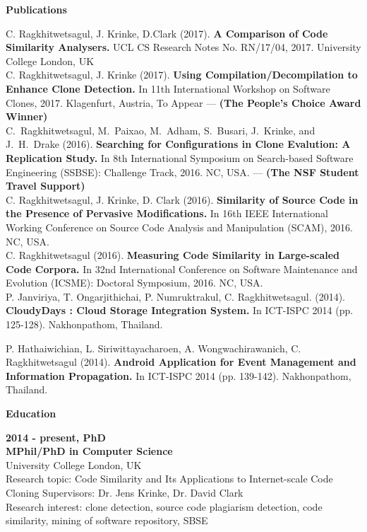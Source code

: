\documentclass[a4paper,12pt,final]{memoir}
\newcommand{\Sep}{\vspace{1.5em}}
\newcommand{\SmallSep}{\vspace{0.5em}}
\newcommand{\CVSection}[1]
	{\Large\textbf{#1}\par
	\SmallSep\normalsize\normalfont}
\newcommand{\CVItem}[1]
	{\textbf{\color{RoyalBlue} #1}}
\begin{document}
\CVSection{Publications}
C. Ragkhitwetsagul, J. Krinke, D.Clark (2017). \CVItem{A Comparison of Code Similarity Analysers.} UCL CS Research Notes No. RN/17/04, 2017. University College London, UK \vspace{2mm} \\
C. Ragkhitwetsagul, J. Krinke (2017). \CVItem{Using Compilation/Decompilation to Enhance Clone Detection.} In 11th International Workshop on Software Clones, 2017. Klagenfurt, Austria, To Appear --- \textbf{(The People's Choice Award Winner)} \vspace{2mm} \\
C.~Ragkhitwetsagul, M.~Paixao, M.~Adham, S.~Busari, J.~Krinke, and J.~H.~Drake (2016). \CVItem{Searching for Configurations in Clone Evalution: A Replication Study.} In 8th International Symposium on Search-based Software Engineering (SSBSE): Challenge Track, 2016. NC, USA. --- \textbf{(The NSF Student Travel Support)} \vspace{2mm} \\
C. Ragkhitwetsagul, J. Krinke, D. Clark (2016). \CVItem{Similarity of Source Code in the Presence of Pervasive Modifications.} In 16th IEEE International Working Conference on Source Code Analysis and Manipulation (SCAM), 2016. NC, USA. \vspace{2mm} \\
C. Ragkhitwetsagul (2016). \CVItem{Measuring Code Similarity in Large-scaled Code Corpora.} In 32nd International Conference on Software Maintenance and Evolution (ICSME): Doctoral Symposium, 2016. NC, USA. \vspace{2mm} \\
P. Janviriya, T. Ongarjithichai, P. Numruktrakul, C. Ragkhitwetsagul. (2014). \CVItem{CloudyDays : Cloud Storage Integration System.} In ICT-ISPC 2014 (pp. 125-128). Nakhonpathom, Thailand. \vspace{2mm} \\

\clearpage
\framebreak
\framebreak

P. Hathaiwichian, L. Siriwittayacharoen, A. Wongwachirawanich, C. Ragkhitwetsagul (2014). \CVItem{Android Application for Event Management and Information Propagation.} In ICT-ISPC 2014 (pp. 139-142). Nakhonpathom, Thailand.
\SmallSep
\Sep

\CVSection{Education}
\CVItem{2014 - present, PhD}\\
\textbf{MPhil/PhD in Computer Science}\\
University College London, UK\\
Research topic: Code Similarity and Its Applications to Internet-scale Code Cloning
Supervisors: Dr. Jens Krinke, Dr. David Clark\\
Research interest: clone detection, source code plagiarism detection, code similarity, mining of software repository, SBSE
\SmallSep
\end{document}
